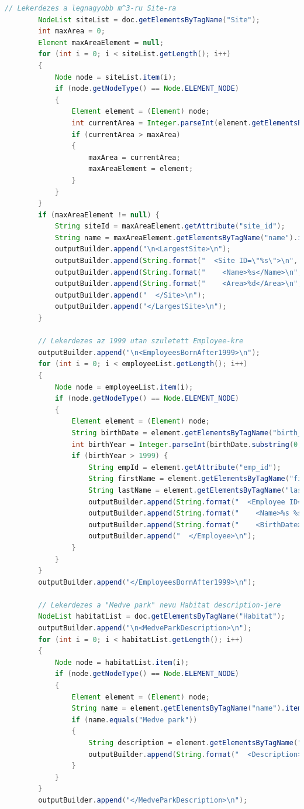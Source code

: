 \documentclass[12pt]{report}
\begin{document}
\begin{lstlisting}[caption={DOMQueryKLNSPG.java} adatlekérdező program, language=Java]
		// Lekerdezes a legnagyobb m^3-ru Site-ra
		NodeList siteList = doc.getElementsByTagName("Site");
		int maxArea = 0;
		Element maxAreaElement = null;
		for (int i = 0; i < siteList.getLength(); i++) 
		{
			Node node = siteList.item(i);
			if (node.getNodeType() == Node.ELEMENT_NODE) 
			{
				Element element = (Element) node;
				int currentArea = Integer.parseInt(element.getElementsByTagName("area").item(0).getTextContent());
				if (currentArea > maxArea) 
				{
					maxArea = currentArea;
					maxAreaElement = element;
				}
			}
		}
		if (maxAreaElement != null) {
			String siteId = maxAreaElement.getAttribute("site_id");
			String name = maxAreaElement.getElementsByTagName("name").item(0).getTextContent();
			outputBuilder.append("\n<LargestSite>\n");
			outputBuilder.append(String.format("  <Site ID=\"%s\">\n", siteId));
			outputBuilder.append(String.format("    <Name>%s</Name>\n", name));
			outputBuilder.append(String.format("    <Area>%d</Area>\n", maxArea));
			outputBuilder.append("  </Site>\n");
			outputBuilder.append("</LargestSite>\n");
		}
		
		// Lekerdezes az 1999 utan szuletett Employee-kre
		outputBuilder.append("\n<EmployeesBornAfter1999>\n");
		for (int i = 0; i < employeeList.getLength(); i++) 
		{
			Node node = employeeList.item(i);
			if (node.getNodeType() == Node.ELEMENT_NODE) 
			{
				Element element = (Element) node;
				String birthDate = element.getElementsByTagName("birth_date").item(0).getTextContent();
				int birthYear = Integer.parseInt(birthDate.substring(0, 4));
				if (birthYear > 1999) {
					String empId = element.getAttribute("emp_id");
					String firstName = element.getElementsByTagName("first_name").item(0).getTextContent();
					String lastName = element.getElementsByTagName("last_name").item(0).getTextContent();
					outputBuilder.append(String.format("  <Employee ID=\"%s\">\n", empId));
					outputBuilder.append(String.format("    <Name>%s %s</Name>\n", firstName, lastName));
					outputBuilder.append(String.format("    <BirthDate>%s</BirthDate>\n", birthDate));
					outputBuilder.append("  </Employee>\n");
				}
			}
		}
		outputBuilder.append("</EmployeesBornAfter1999>\n");
		
		// Lekerdezes a "Medve park" nevu Habitat description-jere
		NodeList habitatList = doc.getElementsByTagName("Habitat");
		outputBuilder.append("\n<MedveParkDescription>\n");
		for (int i = 0; i < habitatList.getLength(); i++) 
		{
			Node node = habitatList.item(i);
			if (node.getNodeType() == Node.ELEMENT_NODE) 
			{
				Element element = (Element) node;
				String name = element.getElementsByTagName("name").item(0).getTextContent();
				if (name.equals("Medve park")) 
				{
					String description = element.getElementsByTagName("description").item(0).getTextContent();
					outputBuilder.append(String.format("  <Description>%s</Description>\n", description));
				}
			}
		}
		outputBuilder.append("</MedveParkDescription>\n");
		

\end{lstlisting}
\end{document}

